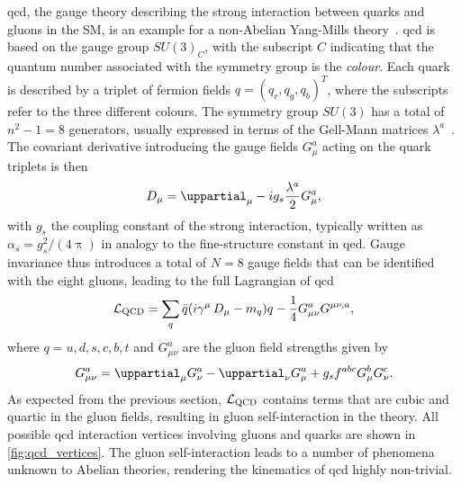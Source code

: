 \gls{qcd}, the gauge theory describing the strong interaction between quarks and gluons in the SM, is an example for a non-Abelian Yang-Mills theory~\cite{PhysRev.96.191}. \gls{qcd} is based on the gauge group $SU(3)_C$, with the subscript $C$ indicating that the quantum number associated with the symmetry group is the \textit{colour}. Each quark is described by a triplet of fermion fields $q = (q_r,q_g,q_b)^T$, where the subscripts refer to the three different colours. The symmetry group $SU(3)$ has a total of $n^2-1 = 8$ generators, usually expressed in terms of the Gell-Mann matrices $\lambda^a$~\cite{Peskin:1995ev}. The covariant derivative introducing the gauge fields $G_\mu^a$ acting on the quark triplets is then
\begin{equation}
	\codiff_\mu = \uppartial_\mu - ig_s \frac{\lambda^a}{2	}G_\mu^a,
\end{equation}
with $g_s$ the coupling constant of the strong interaction, typically written as $\alpha_s = g_s^2 / (4\uppi)$ in analogy to the fine-structure constant in \gls{qed}. Gauge invariance thus introduces a total of $N=8$ gauge fields that can be identified with the eight gluons, leading to the full Lagrangian of \gls{qcd}
\begin{equation}
	\mathcal{L}_\mathrm{QCD} = \sum_q{\bar{q}(i\gamma^\mu\mathop{}\!D_\mu - m_q)q} - \frac{1}{4}G^a_{\mu\nu}G^{\mu\nu,a},
\end{equation}
where $q = u,d,s,c,b,t$ and $G^a_{\mu\nu}$ are the gluon field strengths given by
\begin{equation}
	G^a_{\mu\nu} = \uppartial_\mu G^a_\nu - \uppartial_\nu G^a_\mu + g_s f^{abc}G^b_\mu G^c_\nu.
\end{equation}
As expected from the previous section, $\mathcal{L}_\mathrm{QCD}$ contains terms that are cubic and quartic in the gluon fields, resulting in gluon self-interaction in the theory. All possible \gls{qcd} interaction vertices involving gluons and quarks are shown in \cref{fig:qcd_vertices}. The gluon self-interaction leads to a number of phenomena unknown to Abelian theories, rendering the kinematics of \gls{qcd} highly non-trivial.

